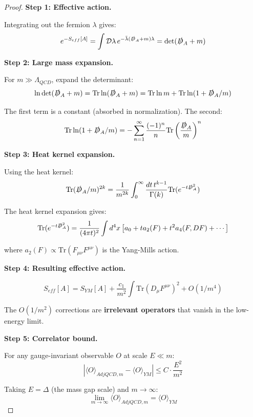 \begin{proof}
\textbf{Step 1: Effective action.}

Integrating out the fermion $\lambda$ gives:
\begin{equation}
e^{-S_{eff}[A]} = \int \mathcal{D}\lambda \, e^{-\bar{\lambda}(\slashed{D}_A + m)\lambda} = \det(\slashed{D}_A + m)
\end{equation}

\textbf{Step 2: Large mass expansion.}

For $m \gg \Lambda_{QCD}$, expand the determinant:
\begin{equation}
\ln \det(\slashed{D}_A + m) = \mathrm{Tr} \ln(\slashed{D}_A + m) = \mathrm{Tr} \ln m + \mathrm{Tr} \ln(1 + \slashed{D}_A/m)
\end{equation}

The first term is a constant (absorbed in normalization). The second:
\begin{equation}
\mathrm{Tr} \ln(1 + \slashed{D}_A/m) = -\sum_{n=1}^\infty \frac{(-1)^n}{n} \mathrm{Tr}\left(\frac{\slashed{D}_A}{m}\right)^n
\end{equation}

\textbf{Step 3: Heat kernel expansion.}

Using the heat kernel:
\begin{equation}
\mathrm{Tr}(\slashed{D}_A/m)^{2k} = \frac{1}{m^{2k}} \int_0^\infty \frac{dt \, t^{k-1}}{\Gamma(k)} \mathrm{Tr}(e^{-t\slashed{D}_A^2})
\end{equation}

The heat kernel expansion gives:
\begin{equation}
\mathrm{Tr}(e^{-t\slashed{D}_A^2}) = \frac{1}{(4\pi t)^2} \int d^4x \left[ a_0 + t a_2(F) + t^2 a_4(F, DF) + \cdots \right]
\end{equation}

where $a_2(F) \propto \mathrm{Tr}(F_{\mu\nu}F^{\mu\nu})$ is the Yang-Mills action.

\textbf{Step 4: Resulting effective action.}

\begin{equation}
S_{eff}[A] = S_{YM}[A] + \frac{c_1}{m^2} \int \mathrm{Tr}(D_\mu F^{\mu\nu})^2 + O(1/m^4)
\end{equation}

The $O(1/m^2)$ corrections are \textbf{irrelevant operators} that vanish in 
the low-energy limit.

\textbf{Step 5: Correlator bound.}

For any gauge-invariant observable $O$ at scale $E \ll m$:
\begin{equation}
\left| \langle O \rangle_{AdjQCD,m} - \langle O \rangle_{YM} \right| \leq C \cdot \frac{E^2}{m^2}
\end{equation}

Taking $E = \Delta$ (the mass gap scale) and $m \to \infty$:
\begin{equation}
\lim_{m \to \infty} \langle O \rangle_{AdjQCD,m} = \langle O \rangle_{YM}
\end{equation}
\end{proof}

